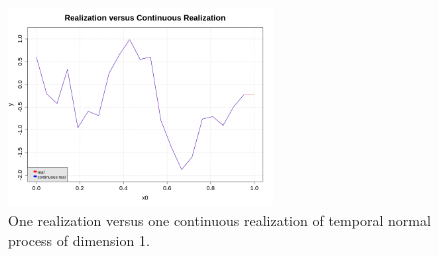              \begin{figure}[H]
               \begin{center}
                 \includegraphics[width=7cm]{Figures/TNProc_real.png}
                 \caption{One realization versus one continuous realization of temporal normal process of dimension 1.}
                 \label{TGP}
               \end{center}
             \end{figure}
